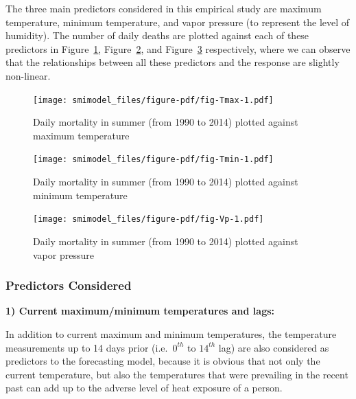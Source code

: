 \documentclass[11pt,a4paper,]{article}
\begin{document}
The three main predictors considered in this empirical study are maximum
temperature, minimum temperature, and vapor pressure (to represent the
level of humidity). The number of daily deaths are plotted against each
of these predictors in Figure~\ref{fig-Tmax}, Figure~\ref{fig-Tmin}, and
Figure~\ref{fig-Vp} respectively, where we can observe that the
relationships between all these predictors and the response are slightly
non-linear.

\begin{figure}

{\centering \texttt{[image: smimodel\_files/figure-pdf/fig-Tmax-1.pdf]}

}

\caption{\label{fig-Tmax}Daily mortality in summer (from 1990 to 2014)
plotted against maximum temperature}

\end{figure}

\begin{figure}

{\centering \texttt{[image: smimodel\_files/figure-pdf/fig-Tmin-1.pdf]}

}

\caption{\label{fig-Tmin}Daily mortality in summer (from 1990 to 2014)
plotted against minimum temperature}

\end{figure}

\begin{figure}

{\centering \texttt{[image: smimodel\_files/figure-pdf/fig-Vp-1.pdf]}

}

\caption{\label{fig-Vp}Daily mortality in summer (from 1990 to 2014)
plotted against vapor pressure}

\end{figure}

\hypertarget{predictors-considered}{%
\subsubsection{Predictors Considered}\label{predictors-considered}}

\textbf{1) Current maximum/minimum temperatures and lags:}

In addition to current maximum and minimum temperatures, the temperature
measurements up to 14 days prior (i.e.~\(0^{th}\) to \(14^{th}\) lag)
are also considered as predictors to the forecasting model, because it
is obvious that not only the current temperature, but also the
temperatures that were prevailing in the recent past can add up to the
adverse level of heat exposure of a person.
\end{document}
